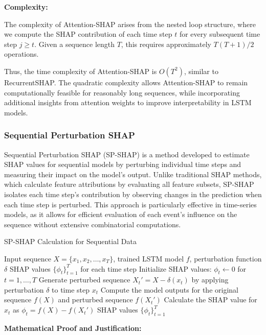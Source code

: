 \textbf{Complexity:}

The complexity of Attention-SHAP arises from the nested loop structure, where we compute the SHAP contribution of each time step \( t \) for every subsequent time step \( j \geq t \). Given a sequence length \( T \), this requires approximately \( T(T+1)/2 \) operations.

Thus, the time complexity of Attention-SHAP is \( O(T^2) \), similar to RecurrentSHAP. The quadratic complexity allows Attention-SHAP to remain computationally feasible for reasonably long sequences, while incorporating additional insights from attention weights to improve interpretability in LSTM models.

\subsubsection{Sequential Perturbation SHAP}

Sequential Perturbation SHAP (SP-SHAP) is a method developed to estimate SHAP values for sequential models by perturbing individual time steps and measuring their impact on the model’s output. Unlike traditional SHAP methods, which calculate feature attributions by evaluating all feature subsets, SP-SHAP isolates each time step’s contribution by observing changes in the prediction when each time step is perturbed. This approach is particularly effective in time-series models, as it allows for efficient evaluation of each event’s influence on the sequence without extensive combinatorial computations.

\begin{algorithm}
\caption{SP-SHAP Calculation for Sequential Data}
\begin{algorithmic}[1]
\Require Input sequence $X = \{x_1, x_2, \ldots, x_T\}$, trained LSTM model $f$, perturbation function $\delta$
\Ensure SHAP values $\{\phi_t\}_{t=1}^T$ for each time step
\State Initialize SHAP values: $\phi_t \gets 0$ for $t = 1, \ldots, T$
    \State Generate perturbed sequence $X_t' = X - \delta(x_t)$ by applying perturbation $\delta$ to time step $x_t$
    \State Compute the model outputs for the original sequence $f(X)$ and perturbed sequence $f(X_t')$
    \State Calculate the SHAP value for $x_t$ as $\phi_t = f(X) - f(X_t')$
\EndFor
\State \Return SHAP values $\{\phi_t\}_{t=1}^T$
\end{algorithmic}
\end{algorithm}

\textbf{Mathematical Proof and Justification:}

